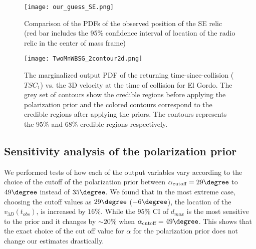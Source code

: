 \begin{figure}
	\texttt{[image: our\_guess\_SE.png]}
	\caption{Comparison of the PDFs of the observed position of the SE relic (red bar
	includes the 95\% confidence interval of location of the radio relic in
the center of mass frame)}
\end{figure}
\begin{figure}
	\texttt{[image: TwoMnWBSG\_2contour2d.png]}
	\caption{The marginalized output PDF of the returning time-since-collision
($TSC_1$) vs. the 3D velocity at the time of collision for El Gordo. The
grey set of contours show the credible regions before applying the
polarization prior and the colored contours correspond to the credible
regions after applying the priors. The contours represents the 95\% and
68\% credible regions respectively. }
	\label{fig:TSC_v3D}
\end{figure}
\subsection{Sensitivity analysis of the polarization prior}
%
\label{sec:sensitivityTests}
We performed tests of how each of the output variables vary according to the
choice of the cutoff of the polarization prior between
$\alpha_{\text{cutoff}} =
29 \degree$ to $49\degree$ instead of $35 \degree$.  
We found that in the most extreme case, choosing the cutoff values as $29
\degree$ ($-6 \degree$), the location of the $v_{3D}(t_{obs})$, is
increased by $ 16 \%$. While the $95\%$ CI of $d_{max}$ is
the most sensitive to the prior and it changes by
$\sim20 \%$ when $\alpha_{\text{cutoff}} = 49 \degree$. 
This shows that the exact choice of the cut off value for $\alpha$ for the
polarization prior does not change our estimates drastically.



